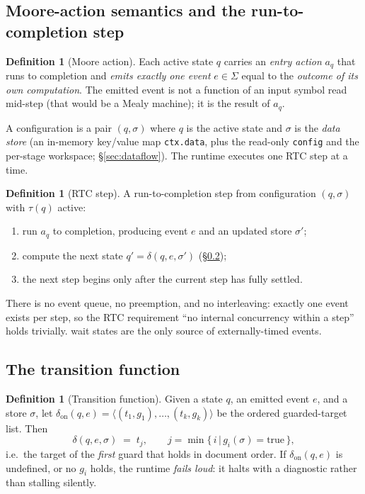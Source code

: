 \documentclass[11pt]{article}
\theoremstyle{plain}
\theoremstyle{definition}
\newtheorem{definition}[theorem]{Definition}
\theoremstyle{remark}
\newcommand{\code}[1]{\texttt{#1}}
\newcommand{\state}[1]{\textsf{#1}}
\newcommand{\transition}{\ensuremath{\delta}}
\newcommand{\given}{\,\vert\,}
\begin{document}
\subsection{Moore-action semantics and the run-to-completion step}

\begin{definition}[Moore action]
Each active state $q$ carries an \emph{entry action} $a_q$ that runs to completion
and \emph{emits exactly one event} $e \in \Sigma$ equal to the \emph{outcome of its
own computation}. The emitted event is not a function of an input symbol read
mid-step (that would be a Mealy machine); it is the result of $a_q$.
\end{definition}

A configuration is a pair $(q, \sigma)$ where $q$ is the active state and $\sigma$
is the \emph{data store} (an in-memory key/value map \code{ctx.data}, plus the
read-only \code{config} and the per-stage workspace; \S\ref{sec:dataflow}). The
runtime executes one RTC step at a time.

\begin{definition}[RTC step]\label{def:rtc}
A run-to-completion step from configuration $(q,\sigma)$ with $\tau(q)$ active:
\begin{enumerate}[nosep]
  \item run $a_q$ to completion, producing event $e$ and an updated store $\sigma'$;
  \item compute the next state $q' = \transition(q, e, \sigma')$ (\S\ref{sec:delta});
  \item the next step begins only after the current step has fully settled.
\end{enumerate}
There is no event queue, no preemption, and no interleaving: exactly one event
exists per step, so the RTC requirement ``no internal concurrency within a step''
holds trivially. \state{wait} states are the only source of externally-timed events.
\end{definition}

\subsection{The transition function}\label{sec:delta}

\begin{definition}[Transition function]\label{def:delta}
Given a state $q$, an emitted event $e$, and a store $\sigma$, let
$\delta_{\mathrm{on}}(q,e) = \langle (t_1,g_1), \dots, (t_k,g_k)\rangle$ be the
ordered guarded-target list. Then
\[
  \transition(q,e,\sigma) \;=\; t_{j}, \qquad
  j = \min\{\, i \given g_i(\sigma) = \text{true} \,\},
\]
i.e.\ the target of the \emph{first} guard that holds in document order. If
$\delta_{\mathrm{on}}(q,e)$ is undefined, or no $g_i$ holds, the runtime
\emph{fails loud}: it halts with a diagnostic rather than stalling silently.
\end{definition}
\end{document}
